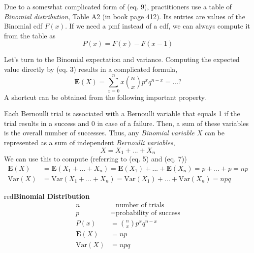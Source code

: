 \documentclass{article}
\newenvironment{formula}[1]{\begin{mybox}{red}{\textbf{#1}}}{\end{mybox}}
\begin{document}
Due to a somewhat complicated form of (eq. 9), practitioners use a table of \textit{Binomial distribution}, Table A2 (in book page 412). Its entries are values of the Binomial cdf $F(x)$. If we need a pmf instead of a cdf, we can always compute it from the table as
\begin{equation*}
    P(x) = F(x) - F(x - 1)
\end{equation*}

Let’s turn to the Binomial expectation and variance. Computing the expected value directly by (eq. 3) results in a complicated formula,
\begin{equation*}
    \mathbf{E}(X) = \sum_{x=0}^{n} x \binom{n}{x} p^x q^{n-x} = ... ?
\end{equation*}
A shortcut can be obtained from the following important property.

Each Bernoulli trial is associated with a Bernoulli variable that equals 1 if the trial results in a success and 0 in case of a failure. Then, a sum of these variables is the overall number
of successes. Thus, any \textit{Binomial variable} $X$ can be represented as a sum of independent \textit{Bernoulli variables},
\begin{equation*}
    X = X_1 + ... + X_n
\end{equation*}
We can use this to compute (referring to (eq. 5) and (eq. 7))
\begin{align*}
    \mathbf{E}(X) &= \mathbf{E}(X_1 + ... + X_n) = \mathbf{E}(X_1) + ... + \mathbf{E}(X_n) = p + ... + p = np\\
    \text{Var}(X) &= \text{Var}(X_1 + ... + X_n) = \text{Var}(X_1) + ... + \text{Var}(X_n) = npq
\end{align*}

\begin{formula}{Binomial Distribution}
\begin{align*}
    n &= \text{number of trials}\\
    p &= \text{probability of success}\\
    P(x) &= \binom{n}{x} p^x q^{n-x}\\
    \mathbf{E}(X) &= np\\
    \text{Var}(X) &= npq
\end{align*}
\end{formula}
\end{document}
